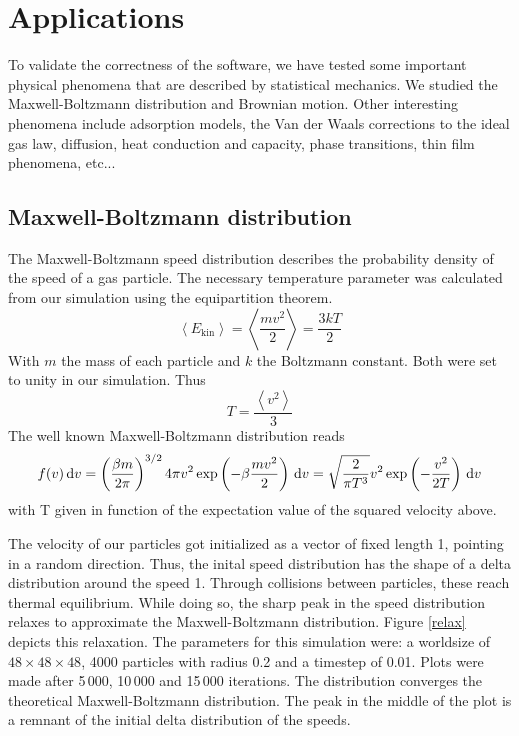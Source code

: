 \section{Applications}

To validate the correctness of the software, we have tested some important 
physical phenomena that are described by statistical mechanics. We studied 
the Maxwell-Boltzmann distribution and Brownian motion. Other interesting 
phenomena include adsorption models, the Van der Waals corrections to the 
ideal gas law, diffusion, heat conduction and capacity, phase transitions, 
thin film phenomena, etc...

\subsection{Maxwell-Boltzmann distribution}
The Maxwell-Boltzmann speed distribution describes the probability density of 
the speed of a gas particle. The necessary temperature parameter was calculated 
from our simulation using the equipartition theorem.
$$
\left< E_{\mathrm{kin}} \right> = \left< \frac{mv^2}{2} \right> = \frac{3kT}{2}
$$
With $m$ the mass of each particle and $k$ the Boltzmann constant. Both were 
set to unity in our simulation. Thus
$$
T = \frac{\left< v^2 \right>}{3}
$$
The well known Maxwell-Boltzmann distribution\cite{maxwellDist} reads $$
f(v)\,\mathrm d v = \left( \frac{\beta m}{2 \pi} \right)^{3/2} 4 \pi v^2
\exp\left( -\beta \frac{mv^2}{2}\right) \,\mathrm d v =
\sqrt{ \frac{2}{\pi T^3} } v^2 \exp \left(-\frac{v^2}{2T}\right) \,\mathrm d v
$$
with T given in function of the expectation value of the squared velocity 
above.

The velocity of our particles got initialized as a vector of fixed length 
1, pointing in a random direction. Thus, the inital speed distribution has 
the shape of a delta distribution around the speed 1. Through collisions 
between particles, these reach thermal equilibrium. While doing so, the sharp 
peak in the speed distribution relaxes to approximate the Maxwell-Boltzmann 
distribution. Figure \ref{relax} depicts this relaxation.  The parameters for 
this simulation were: a worldsize of $48 \times 48 \times 48$, 4000 particles 
with radius 0.2 and a timestep of 0.01. Plots were made after 5\,000, 10\,000 
and 15\,000 iterations. The distribution converges the theoretical 
Maxwell-Boltzmann distribution. The peak in the middle of the plot is a remnant 
of the initial delta distribution of the speeds.


